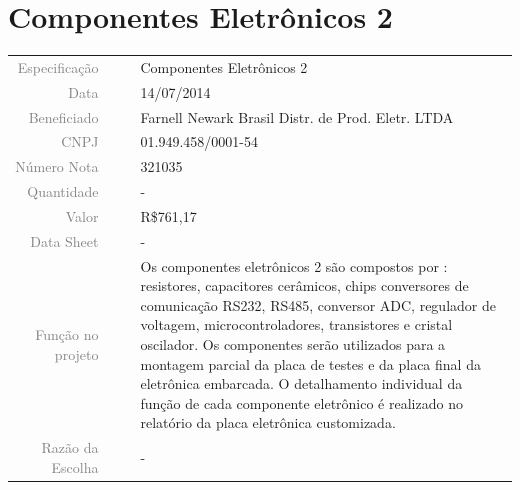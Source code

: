 

\section{Componentes Eletrônicos 2}
\label{componentes_2}


\begin{table}[ht!]

	\begin{tabular}{r l|l p{12cm} }
		
		\textcolor{gray}{Especificação} &&& 	{Componentes Eletrônicos 2}\\
		\textcolor{gray}{Data} &&& 				{14/07/2014}\\
        \textcolor{gray}{Beneficiado} &&&		{Farnell Newark Brasil Distr. de
        Prod. Eletr. LTDA}
        \\
        \textcolor{gray}{CNPJ} &&& 				{01.949.458/0001-54} \\
        \textcolor{gray}{Número Nota} &&& 		{321035} \\
		\textcolor{gray}{Quantidade} &&& 		{-} \\
		\textcolor{gray}{Valor} &&& 			{R\$761,17} \\
		\textcolor{gray}{Data Sheet} &&& 		{-} \\

		\textcolor{gray}{Função no projeto} &&& {Os componentes eletrônicos 2 são
		compostos por : resistores, capacitores cerâmicos, chips conversores de
		comunicação RS232, RS485, conversor ADC, regulador de voltagem,
		microcontroladores, transistores e cristal oscilador. Os componentes serão
		utilizados para a montagem parcial da placa de testes e da placa final da
		eletrônica embarcada. O detalhamento individual da função de cada componente
		eletrônico é realizado no relatório da placa eletrônica customizada.}
		\\
		\textcolor{gray}{Razão da Escolha} &&& {-}

	\end{tabular}
\end{table}

\newpage


